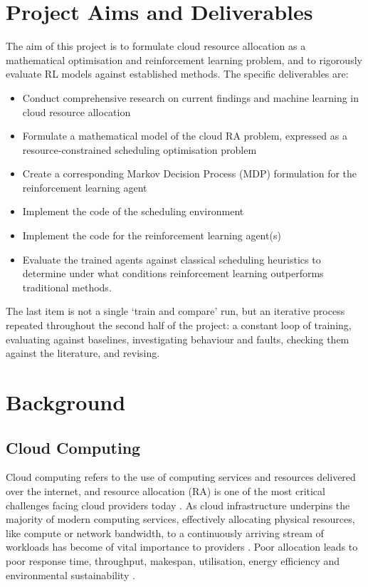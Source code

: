 \documentclass[12pt]{article}
\begin{document}
\section{Project Aims and Deliverables}
The aim of this project is to formulate cloud resource allocation as a mathematical optimisation and reinforcement learning problem, and to rigorously evaluate RL models against established methods. The specific deliverables are:
\begin{itemize}
    \item Conduct comprehensive research on current findings and machine learning in cloud resource allocation
    \item Formulate a mathematical model of the cloud RA problem, expressed as a resource-constrained scheduling optimisation problem
    \item Create a corresponding Markov Decision Process (MDP) formulation for the reinforcement learning agent
    \item Implement the code of the scheduling environment
    \item Implement the code for the reinforcement learning agent(s)
    \item Evaluate the trained agents against classical scheduling heuristics to determine under what conditions reinforcement learning outperforms traditional methods.
\end{itemize}
The last item is not a single `train and compare' run, but an iterative process repeated throughout the second half of the project: a constant loop of training, evaluating against baselines, investigating behaviour and faults, checking them against the literature, and revising.

\section{Background}
\subsection{Cloud Computing}
Cloud computing refers to the use of computing services and resources delivered over the internet, and resource allocation (RA) is one of the most critical challenges facing cloud providers today \cite{saidi2023, huawei2022}. As cloud infrastructure underpins the majority of modern computing services, effectively allocating physical resources, like compute or network bandwidth, to a continuously arriving stream of workloads has become of vital importance to providers \cite{sdn2021}. Poor allocation leads to poor response time, throughput, makespan, utilisation, energy efficiency and environmental sustainability \cite{cloudkpi2010, dvbpp2026, mohamaddiah2014, anuradha2014}.
\end{document}

